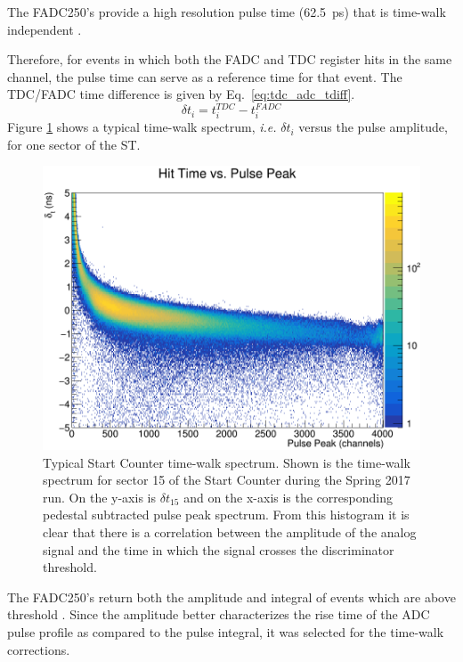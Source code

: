 The FADC250's provide a high resolution pulse time (62.5~ps) that is time-walk independent \cite{pooser16} \cite{dong_fadc}.  %

Therefore, for events in which both the FADC and TDC register hits in the same channel, the pulse time can serve as a reference time for that event.  The TDC/FADC time difference is given by Eq.~\ref{eq:tdc_adc_tdiff}.
	\begin{equation} \label{eq:tdc_adc_tdiff}
		\delta t_{i} = t^{TDC}_{i} - t^{FADC}_{i}
	\end{equation}
Figure \ref{fig:twdistuncorrch15} shows a typical time-walk spectrum, \textit{i.e.} $\delta t_{i}$ versus the pulse amplitude, for one sector of the ST.
	\begin{figure}[!htb]
		\centering
		\includegraphics[width=1.0\columnwidth]{calibration/figs/tw_dist_uncorr_ch15}
		\caption{Typical Start Counter time-walk spectrum.  Shown is the time-walk spectrum for sector 15 of the Start Counter during the Spring 2017 run. On the y-axis is $\delta t_{15}$ and on the x-axis is the corresponding pedestal subtracted pulse peak spectrum. From this histogram it is clear that there is a correlation between the amplitude of the analog signal and the time in which the signal crosses the discriminator threshold.}
		\label{fig:twdistuncorrch15}
	\end{figure}
The FADC250's return both the amplitude and integral of events which are above threshold \cite{dong_fadc}.  Since the amplitude better characterizes the rise time of the ADC pulse profile as compared to the pulse integral, it was selected for the time-walk corrections.

